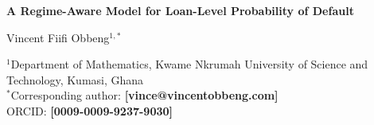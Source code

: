 \begin{center}
{\LARGE\bfseries A Regime-Aware Model for Loan-Level Probability of Default\par}
\vspace{1.2em}
{\large Vincent Fiifi Obbeng$^{1,*}$\par}
\vspace{0.6em}
$^{1}$Department of Mathematics, Kwame Nkrumah University of Science and Technology, Kumasi, Ghana\\
$^{*}$Corresponding author: \textbf{[vince@vincentobbeng.com]}\\
ORCID: \textbf{[0009-0009-9237-9030]}\\
\end{center}

\vspace{1em}


\vspace{1em}
